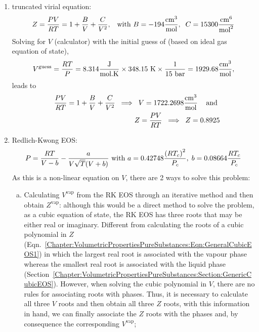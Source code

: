\begin{probsol}
     \begin{enumerate}[1.]
%
        \item truncated virial equation:
            \begin{displaymath}
               Z =  \displaystyle\frac{PV}{RT}=1+\displaystyle\frac{B}{V}+\displaystyle\frac{C}{V^{2}}, \;\;\;\text{with } B=-194\displaystyle\frac{\text{cm}^{3}}{\text{mol}},\;\;C=15300 \displaystyle\frac{\text{cm}^{6}}{\text{mol}^{2}}
            \end{displaymath}
            Solving for $V$ (calculator) with the initial guess of (based on ideal gas equation of state),
            \begin{displaymath}
               V^{\text{guess}} = \displaystyle\frac{RT}{P} = 8.314 \displaystyle\frac{\text{J}}{\text{mol.K}} \times 348.15\text{ K} \times \displaystyle\frac{1}{15\text{ bar}} = 1929.68 \displaystyle\frac{\text{cm}^{3}}{\text{mol}},
            \end{displaymath}
            leads to
            \begin{eqnarray}
               &&\displaystyle\frac{PV}{RT}=1+\displaystyle\frac{B}{V}+\displaystyle\frac{C}{V^{2}} \;\;\Longrightarrow \;\; V = 1722.2698 \displaystyle\frac{\text{cm}^{3}}{\text{mol}}\;\;\;\text{ and } \nonumber \\
               && Z =  \displaystyle\frac{PV}{RT} \;\;\Longrightarrow \;\; Z = 0.8925 \nonumber
            \end{eqnarray}
%
        \item Redlich-Kwong EOS:
            \begin{displaymath}
               P = \displaystyle\frac{RT}{V-b} - \displaystyle\frac{a}{V\sqrt{T}(V+b)}\text{ with } a = 0.42748\displaystyle\frac{\left(R T_{c}\right)^{2}}{P_{c}},\; b = 0.08664\displaystyle\frac{R T_{c}}{P_{c}}
            \end{displaymath}
            As this is a non-linear equation on $V$, there are 2 ways to solve this problem:
            \begin{enumerate}[a)]
               \item Calculating $V^{\text{vap}}$ from the RK EOS through an iterative method and then obtain $Z^{\text{vap}}$: although this would be a direct method to solve the problem, as a cubic equation of state, the RK EOS has three roots that may be either real or imaginary. Different from calculating the roots of a cubic polynomial in $Z$ (Eqn.~\ref{Chapter:VolumetricPropertiesPureSubstances:Eqn:GeneralCubicEOS1}) in which the largest real root is associated with the vapour phase whereas the smallest real root is associated with the liquid phase (Section~\ref{Chapter:VolumetricPropertiesPureSubstances:Section:GenericCubicEOS}). However, when solving the cubic polynomial in $V$, there are no rules for associating roots with phases. Thus, it is necessary to calculate all three $V$ roots and then obtain all three $Z$ roots, with this information in hand, we can finally associate the $Z$ roots with the phases and, by consequence the corresponding $V^{\text{vap}}$;

\end{enumerate}
\end{enumerate}
\end{probsol}
